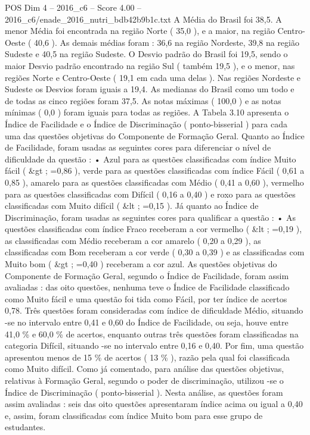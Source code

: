 \begin{textsample}{POS Dim 4 – 2016\_c6 – Score 4.00 – 2016\_c6/enade\_2016\_nutri\_bdb42b9b1c.txt}
A Média do Brasil foi 38,5.
A menor Média foi encontrada na região Norte ( 35,0 ), e a maior, na região Centro-Oeste ( 40,6 ).
As demais médias foram : 36,6 na região Nordeste, 39,8 na região Sudeste e 40,5 na região Sudeste.
O Desvio padrão do Brasil foi 19,5, sendo o maior Desvio padrão encontrado na região Sul ( também 19,5 ), e o menor, nas regiões Norte e Centro-Oeste ( 19,1 em cada uma delas ).
Nas regiões Nordeste e Sudeste os Desvios foram iguais a 19,4.
As medianas do Brasil como um todo e de todas as cinco regiões foram 37,5.
As notas máximas ( 100,0 ) e as notas mínimas ( 0,0 ) foram iguais para todas as regiões.
A Tabela 3.10 apresenta o Índice de Facilidade e o Índice de Discriminação ( ponto-bisserial ) para cada uma das questões objetivas do Componente de Formação Geral.
Quanto ao Índice de Facilidade, foram usadas as seguintes cores para diferenciar o nível de dificuldade da questão : • Azul para as questões classificadas com índice Muito fácil ( \&gt ; =0,86 ), verde para as questões classificadas com índice Fácil ( 0,61 a 0,85 ), amarelo para as questões classificadas com Médio ( 0,41 a 0,60 ), vermelho para as questões classificadas com Difícil ( 0,16 a 0,40 ) e roxo para as questões classificadas com Muito difícil ( \&lt ; =0,15 ).
Já quanto ao Índice de Discriminação, foram usadas as seguintes cores para qualificar a questão : • As questões classificadas com índice Fraco receberam a cor vermelho ( \&lt ; =0,19 ), as classificadas com Médio receberam a cor amarelo ( 0,20 a 0,29 ), as classificadas com Bom receberam a cor verde ( 0,30 a 0,39 ) e as classificadas com Muito bom ( \&gt ; =0,40 ) receberam a cor azul.
As questões objetivas do Componente de Formação Geral, segundo o Índice de Facilidade, foram assim avaliadas : das oito questões, nenhuma teve o Índice de Facilidade classificado como Muito fácil e uma questão foi tida como Fácil, por ter índice de acertos 0,78.
Três questões foram consideradas com índice de dificuldade Médio, situando -se no intervalo entre 0,41 e 0,60 do Índice de Facilidade, ou seja, houve entre 41,0 \% e 60,0 \% de acertos, enquanto outras três questões foram classificadas na categoria Difícil, situando -se no intervalo entre 0,16 e 0,40.
Por fim, uma questão apresentou menos de 15 \% de acertos ( 13 \% ), razão pela qual foi classificada como Muito difícil.
Como já comentado, para análise das questões objetivas, relativas à Formação Geral, segundo o poder de discriminação, utilizou -se o Índice de Discriminação ( ponto-bisserial ).
Nesta análise, as questões foram assim avaliadas : seis das oito questões apresentaram índice acima ou igual a 0,40 e, assim, foram classificadas com índice Muito bom para esse grupo de estudantes.

\end{textsample}
